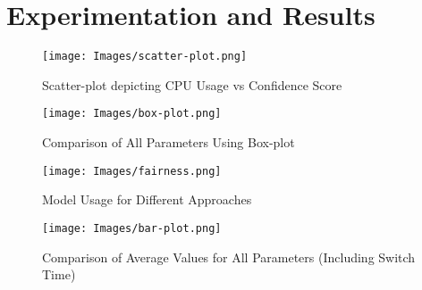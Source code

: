 \section{Experimentation and Results}

\begin{table*}[ht]
    \centering
    \caption{Performance metrics comparison of different approaches.}
    \label{tab:table}
\end{table*}

\begin{figure}
    \centering
\texttt{[image: Images/scatter-plot.png]}
    \caption{Scatter-plot depicting CPU Usage vs Confidence Score}
    \label{fig:scatter-plot}
\end{figure}

\begin{figure*}[ht]
    \centering
    \texttt{[image: Images/box-plot.png]}
    \caption{Comparison of All Parameters Using Box-plot}
    \label{fig:box-plot}
\end{figure*}

\begin{figure}
    \centering
    \texttt{[image: Images/fairness.png]}
    \caption{Model Usage for Different Approaches}
    \label{fig:model-usage}
\end{figure}


\begin{figure}
    \centering
    \texttt{[image: Images/bar-plot.png]}
    \caption{Comparison of Average Values for All Parameters (Including Switch Time)}
    \label{fig:all-parameters-comparision}
\end{figure}



